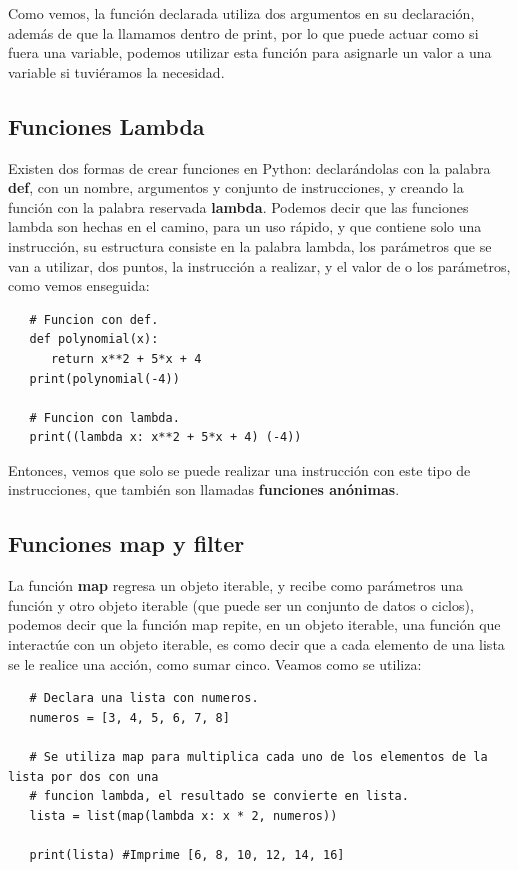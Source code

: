 Como vemos, la función declarada utiliza dos argumentos en su declaración, además de que la llamamos dentro de print, por lo que puede actuar como si fuera una variable, podemos utilizar esta función para asignarle un valor a una variable si tuviéramos la necesidad.


\subsection{Funciones Lambda}
\hspace{0.55cm}Existen dos formas de crear funciones en Python: declarándolas con la palabra \textbf{def}, con un nombre, argumentos y conjunto de instrucciones, y creando la función con la palabra reservada \textbf{lambda}. Podemos decir que las funciones lambda son hechas en el camino, para un uso rápido, y que contiene solo una instrucción, su estructura consiste en la palabra lambda, los parámetros que se van a utilizar, dos puntos, la instrucción a realizar, y el valor de o los parámetros, como vemos enseguida:
\begin{lstlisting}
   # Funcion con def.
   def polynomial(x):
      return x**2 + 5*x + 4
   print(polynomial(-4))

   # Funcion con lambda.
   print((lambda x: x**2 + 5*x + 4) (-4))
\end{lstlisting}

Entonces, vemos que solo se puede realizar una instrucción con este tipo de instrucciones, que también son llamadas \textbf{funciones anónimas}.


\subsection{Funciones map y filter}
\hspace{0.55cm}La función \textbf{map} regresa un objeto iterable, y recibe como parámetros una función y otro objeto iterable (que puede ser un conjunto de datos o ciclos), podemos decir que la función map repite, en un objeto iterable, una función que interactúe con un objeto iterable, es como decir que a cada elemento de una lista se le realice una acción, como sumar cinco. Veamos como se utiliza:
\begin{lstlisting}
   # Declara una lista con numeros.
   numeros = [3, 4, 5, 6, 7, 8]
   
   # Se utiliza map para multiplica cada uno de los elementos de la lista por dos con una
   # funcion lambda, el resultado se convierte en lista.
   lista = list(map(lambda x: x * 2, numeros))
   
   print(lista) #Imprime [6, 8, 10, 12, 14, 16]
\end{lstlisting}

